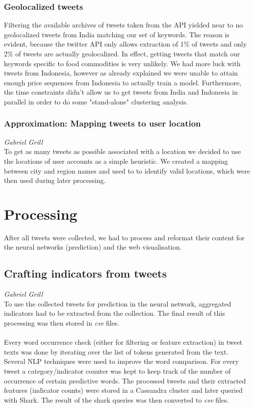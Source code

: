 \subsubsection*{Geolocalized tweets}
Filtering the available archives of tweets taken from the API yielded near to no geolocalized tweets from India matching our set of keywords. The reason is evident, because the twitter API only allows extraction of 1\% of tweets and only 2\% of tweets are actually geolocalized. In effect, getting tweets that match our keywords specific to food commodities is very unlikely. We had more luck with tweets from Indonesia, however as already explained we were unable to attain enough price sequences from Indonesia to actually train a model. Furthermore, the time constraints didn't allow us to get tweets from India and Indonesia in parallel in order to do some "stand-alone" clustering analysis.

\subsubsection*{Approximation: Mapping tweets to user location}
\emph{Gabriel Grill} \\
To get as many tweets as possible associated with a location we decided to use the locations of user accounts as a simple heuristic. We created a mapping between city and region names and used to to identify valid locations, which were then used during later processing.

\section*{Processing}
After all tweets were collected, we had to process and reformat their content for the neural networks (prediction) and the web visualisation.

\subsection*{Crafting indicators from tweets}
\emph{Gabriel Grill} \\
To use the collected tweets for prediction in the neural network, aggregated indicators had to be extracted from the collection. The final result of this processing was then stored in \emph{csv} files.
\\ \\
Every word occurrence check (either for filtering or feature extraction) in tweet texts was done by iterating over the list of tokens generated from the text. Several NLP techniques were used to improve the word comparison. For every tweet a category/indicator counter was kept to keep track of the number of occurrence of certain predictive words. The processed tweets and their extracted features (indicator counts) were stored in a Cassandra cluster and later queried with Shark. The result of the shark queries was then converted to \emph{csv} files.

